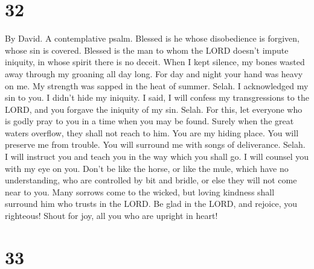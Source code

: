 \hypertarget{section-31}{%
\section{32}\label{section-31}}

By David. A contemplative psalm.  Blessed is he whose
disobedience is forgiven, whose sin is covered.  Blessed
is the man to whom the LORD doesn't impute iniquity, in whose spirit
there is no deceit.  When I kept silence, my bones wasted
away through my groaning all day long.  For day and night
your hand was heavy on me. My strength was sapped in the heat of summer.
Selah.  I acknowledged my sin to you. I didn't hide my
iniquity. I said, I will confess my transgressions to the LORD, and you
forgave the iniquity of my sin. Selah.  For this, let
everyone who is godly pray to you in a time when you may be found.
Surely when the great waters overflow, they shall not reach to him.
 You are my hiding place. You will preserve me from
trouble. You will surround me with songs of deliverance. Selah.
 I will instruct you and teach you in the way which you
shall go. I will counsel you with my eye on you.  Don't be
like the horse, or like the mule, which have no understanding, who are
controlled by bit and bridle, or else they will not come near to you.
 Many sorrows come to the wicked, but loving kindness
shall surround him who trusts in the LORD.  Be glad in
the LORD, and rejoice, you righteous! Shout for joy, all you who are
upright in heart!

\hypertarget{section-32}{%
\section{33}\label{section-32}}

